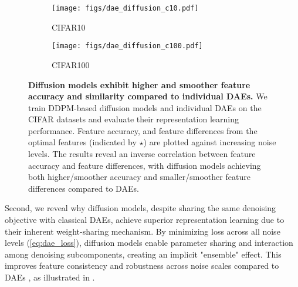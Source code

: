 \begin{figure*}[t]
    \begin{center}
    \begin{subfigure}{0.47\textwidth}
    \texttt{[image: figs/dae\_diffusion\_c10.pdf]}
    \caption{CIFAR10} 
    \end{subfigure} \quad %
    \begin{subfigure}{0.47\textwidth}
    \texttt{[image: figs/dae\_diffusion\_c100.pdf]}
    \caption{CIFAR100} 
    \end{subfigure}
    \end{center}
    \vspace{-0.1in}
\caption{\textbf{Diffusion models exhibit higher and smoother feature accuracy and similarity compared to individual DAEs.} We train DDPM-based diffusion models and individual DAEs on the CIFAR datasets and evaluate their representation learning performance. Feature accuracy, and feature differences from the optimal features (indicated by {\color{cyan} $\star$}) are plotted against increasing noise levels. The results reveal an inverse correlation between feature accuracy and feature differences, with diffusion models achieving both higher/smoother accuracy and smaller/smoother feature differences compared to DAEs.}
\vspace{-0.05in}
\label{fig:dae_diffusion}
\end{figure*}


Second, we reveal why diffusion models, despite sharing the same denoising objective with classical DAEs, achieve superior representation learning due to their inherent weight-sharing mechanism. By minimizing loss across all noise levels (\ref{eq:dae_loss}), diffusion models enable parameter sharing and interaction among denoising subcomponents, creating an implicit "ensemble" effect. This improves feature consistency and robustness across noise scales compared to DAEs \citep{chen2024deconstructing}, as illustrated in .

